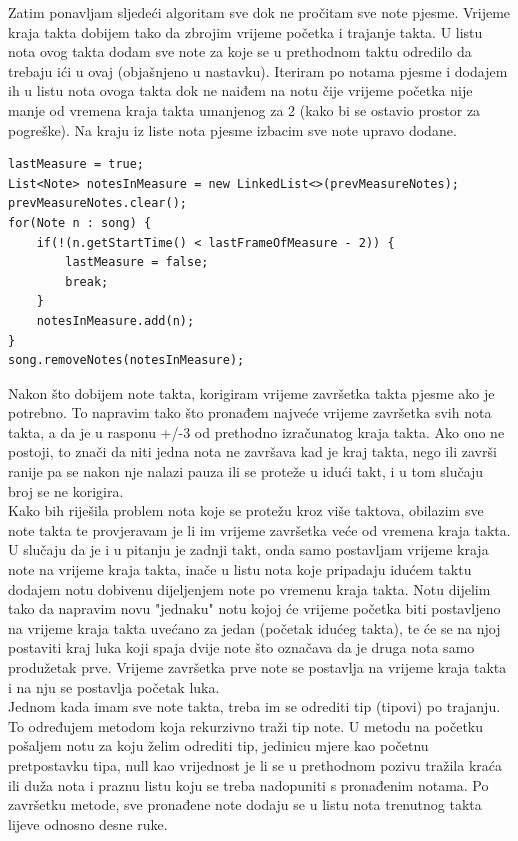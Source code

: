 \documentclass[times, utf8, zavrsni, numeric]{fer}
\begin{document}
Zatim ponavljam sljedeći algoritam sve dok ne pročitam sve note pjesme. Vrijeme kraja takta dobijem tako da zbrojim vrijeme početka i trajanje takta. U listu nota ovog takta dodam sve note za koje se u prethodnom taktu odredilo da trebaju ići u ovaj (objašnjeno u nastavku). Iteriram po notama pjesme i dodajem ih u listu nota ovoga takta dok ne naiđem na notu čije vrijeme početka nije manje od vremena kraja takta umanjenog za 2 (kako bi se ostavio prostor za pogreške). Na kraju iz liste nota pjesme izbacim sve note upravo dodane.
\begin{lstlisting}
lastMeasure = true;
List<Note> notesInMeasure = new LinkedList<>(prevMeasureNotes);
prevMeasureNotes.clear();
for(Note n : song) {
	if(!(n.getStartTime() < lastFrameOfMeasure - 2)) {
		lastMeasure = false;
		break;
	}
	notesInMeasure.add(n);
}
song.removeNotes(notesInMeasure);
\end{lstlisting}

Nakon što dobijem note takta, korigiram vrijeme završetka takta pjesme ako je potrebno. To napravim tako što pronađem najveće vrijeme završetka svih nota takta, a da je u rasponu +/-3 od prethodno izračunatog kraja takta. Ako ono ne postoji, to znači da niti jedna nota ne završava kad je kraj takta, nego ili završi ranije pa se nakon nje nalazi pauza ili se proteže u idući takt, i u tom slučaju broj se ne korigira.\\

Kako bih riješila problem nota koje se protežu kroz više taktova, obilazim sve note takta te provjeravam je li im vrijeme završetka veće od vremena kraja takta. U slučaju da je i u pitanju je zadnji takt, onda samo postavljam vrijeme kraja note na vrijeme kraja takta, inače u listu nota koje pripadaju idućem taktu dodajem notu dobivenu dijeljenjem note po vremenu kraja takta. Notu dijelim tako da napravim novu "jednaku" notu kojoj će vrijeme početka biti postavljeno na vrijeme kraja takta uvećano za jedan (početak idućeg takta), te će se na njoj postaviti kraj luka koji spaja dvije note što označava da je druga nota samo produžetak prve. Vrijeme završetka prve note se postavlja na vrijeme kraja takta i na nju se postavlja početak luka.\\

Jednom kada imam sve note takta, treba im se odrediti tip (tipovi) po trajanju. To određujem metodom koja rekurzivno traži tip note. U metodu na početku pošaljem notu za koju želim odrediti tip, jedinicu mjere kao početnu pretpostavku tipa, null kao vrijednost je li se u prethodnom pozivu tražila kraća ili duža nota i praznu listu koju se treba nadopuniti s pronađenim notama. Po završetku metode, sve pronađene note dodaju se u listu nota trenutnog takta lijeve odnosno desne ruke.\\
\end{document}
